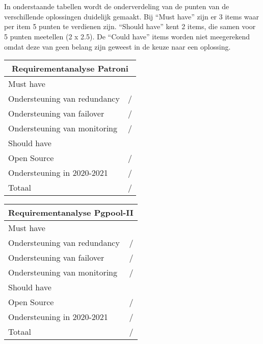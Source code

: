 \section{}
\label{sec:Resultatenanalyse}

\subsection{}
\label{subsec:Resultaten requirements}

In onderstaande tabellen wordt de onderverdeling van de punten van de verschillende oplossingen duidelijk gemaakt. Bij “Must have” zijn er 3 items waar per item 5 punten te verdienen zijn. “Should have” kent 2 items, die samen voor 5 punten meetellen (2 x 2.5). De “Could have” items worden niet meegerekend omdat deze van geen belang zijn geweest in de keuze naar een oplossing.



\begin{tabular}{ |p{6cm}||p{6cm}|  }
    \hline
    \multicolumn{2}{|c|}{Requirementanalyse Patroni} \\
    \hline
    Must have & \\
    \hline
    Ondersteuning van redundancy  & / \\
    Ondersteuning van failover &  / \\
    Ondersteuning van monitoring & / \\
    \hline
    Should have & \\
    \hline
   Open Source &  / \\
   Ondersteuning in 2020-2021 & / \\
    \hline
    \hline
    Totaal & / \\
    \hline
\end{tabular}


\caption[Tabel 1: Requirementanalyse Patroni]
\newline

\begin{tabular}{ |p{6cm}||p{6cm}|  }
    \hline
    \multicolumn{2}{|c|}{Requirementanalyse Pgpool-II} \\
    \hline
    Must have & \\
    \hline
    Ondersteuning van redundancy  & / \\
    Ondersteuning van failover &  / \\
    Ondersteuning van monitoring & / \\
    \hline
    Should have & \\
    \hline
    Open Source &  / \\
    Ondersteuning in 2020-2021 & / \\
    \hline
    \hline
    Totaal & / \\
    \hline
\end{tabular}


